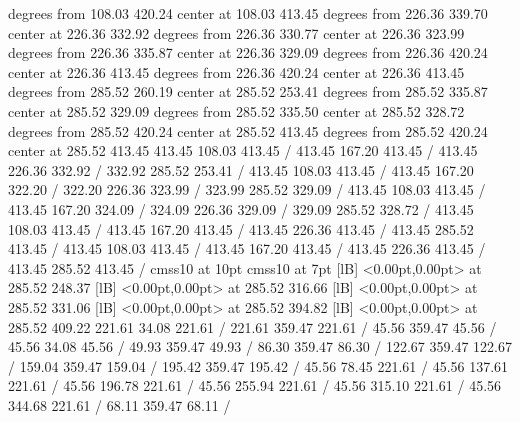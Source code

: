 { degrees from 108.03 420.24 center at 108.03 413.45
 degrees from 226.36 339.70 center at 226.36 332.92
 degrees from 226.36 330.77 center at 226.36 323.99
 degrees from 226.36 335.87 center at 226.36 329.09
 degrees from 226.36 420.24 center at 226.36 413.45
 degrees from 226.36 420.24 center at 226.36 413.45
 degrees from 285.52 260.19 center at 285.52 253.41
 degrees from 285.52 335.87 center at 285.52 329.09
 degrees from 285.52 335.50 center at 285.52 328.72
 degrees from 285.52 420.24 center at 285.52 413.45
 degrees from 285.52 420.24 center at 285.52 413.45
\setdashpattern <4pt, 4pt>
 413.45 108.03 413.45 /
 413.45 167.20 413.45 /
 413.45 226.36 332.92 /
 332.92 285.52 253.41 /
\setdashpattern <4pt, 4pt>
 413.45 108.03 413.45 /
 413.45 167.20 322.20 /
 322.20 226.36 323.99 /
 323.99 285.52 329.09 /
\setdashpattern <4pt, 4pt>
 413.45 108.03 413.45 /
 413.45 167.20 324.09 /
 324.09 226.36 329.09 /
 329.09 285.52 328.72 /
\setdashpattern <4pt, 4pt>
 413.45 108.03 413.45 /
 413.45 167.20 413.45 /
 413.45 226.36 413.45 /
 413.45 285.52 413.45 /
\setdashpattern <4pt, 4pt>
 413.45 108.03 413.45 /
 413.45 167.20 413.45 /
 413.45 226.36 413.45 /
 413.45 285.52 413.45 /
\font\picfont cmss10 at 10pt\picfont
\font\picfont cmss10 at 7pt\picfont
{}  [lB] <0.00pt,0.00pt> at 285.52 248.37
  [lB] <0.00pt,0.00pt> at 285.52 316.66
  [lB] <0.00pt,0.00pt> at 285.52 331.06
  [lB] <0.00pt,0.00pt> at 285.52 394.82
  [lB] <0.00pt,0.00pt> at 285.52 409.22
\setsolid
{} 221.61 34.08 221.61 /
 221.61 359.47 221.61 /
 45.56 359.47 45.56 /
 45.56 34.08 45.56 /
\setsolid
{} 49.93 359.47 49.93 /
\setsolid
{} 86.30 359.47 86.30 /
\setsolid
{} 122.67 359.47 122.67 /
\setsolid
{} 159.04 359.47 159.04 /
\setsolid
{} 195.42 359.47 195.42 /
\setsolid
{} 45.56 78.45 221.61 /
\setsolid
{} 45.56 137.61 221.61 /
\setsolid
{} 45.56 196.78 221.61 /
\setsolid
{} 45.56 255.94 221.61 /
\setsolid
{} 45.56 315.10 221.61 /
\setsolid
{} 45.56 344.68 221.61 /
\setsolid
{} 68.11 359.47 68.11 /
}
